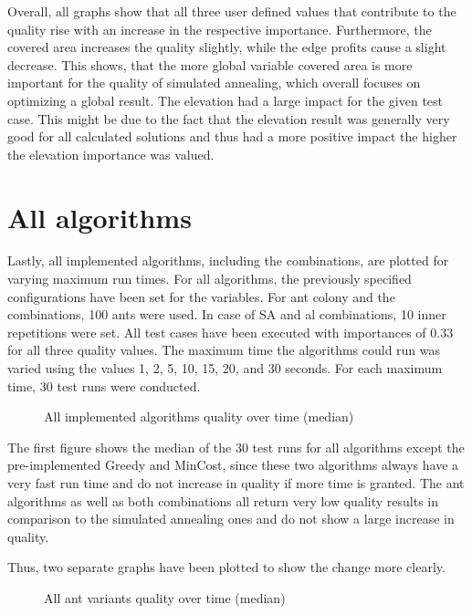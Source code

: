 Overall, all graphs show that all three user defined values that contribute to the quality rise with an increase in the respective importance.
Furthermore, the covered area increases the quality slightly, while the edge profits cause a slight decrease.
This shows, that the more global variable covered area is more important for the quality of simulated annealing, which overall focuses on optimizing a global result.
The elevation had a large impact for the given test case.
This might be due to the fact that the elevation result was generally very good for all calculated solutions and thus had a more positive impact the higher the elevation importance was valued.





\section{All algorithms}

Lastly, all implemented algorithms, including the combinations, are plotted for varying maximum run times. 
For all algorithms, the previously specified configurations have been set for the variables.
For ant colony and the combinations, 100 ants were used. 
In case of SA and al combinations, 10 inner repetitions were set.
All test cases have been executed with importances of 0.33 for all three quality values.
The maximum time the algorithms could run was varied using the values 1, 2, 5, 10, 15, 20, and 30 seconds.
For each maximum time, 30 test runs were conducted.

\begin{figure}[H]
	\centering
	
	\caption{All implemented algorithms quality over time (median)}
	\label{fig:AllOverTime}
\end{figure}


The first figure shows the median of the 30 test runs for all algorithms except the pre-implemented Greedy and MinCost, since these two algorithms always have a very fast run time and do not increase in quality if more time is granted.
The ant algorithms as well as both combinations all return very low quality results in comparison to the simulated annealing ones and do not show a large increase in quality. 

Thus, two separate graphs have been plotted to show the change more clearly. 


\begin{figure}[H]
	\centering
	
	\caption{All ant variants quality over time (median)}
	\label{fig:AllOverTimeAnt}
\end{figure}


